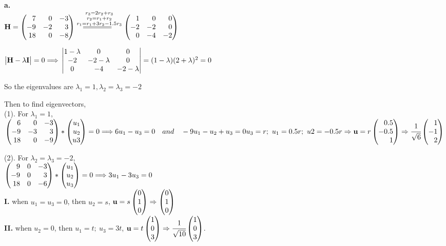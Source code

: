 \documentclass[12pt,a4paper]{article}
\begin{document}
    \textbf{a.}\\
    $\mathbf{H}=\newvec{7&0&-3\\-9&-2&3\\18&0&-8}\stackrel{r_3=2r_2+r_3}{\stackrel{r_2=r_1+r_2}{\stackrel{r_1=r_1+3r_2-1.5r_3}{\longeq{6}}}}\newvec{1&0&0\\-2&-2&0\\0&-4&-2}$

    $\begin{vmatrix} \mathbf{H}-\lambda \mathbf{I} \end{vmatrix}=0 \Longrightarrow \\
    \begin{vmatrix} 1-\lambda&0&0\\-2&-2-\lambda&0\\0&-4&-2-\lambda \end{vmatrix}=(1-\lambda)(2+\lambda)^2=0$

    \noindent So the eigenvalues are $\lambda_1=1,\lambda_2=\lambda_3=-2$

    \noindent Then to find eigenvectors, \\
    (1). For $\lambda_1=1$,\\
    $\newvec{6&0&-3\\-9&-3&3\\18&0&-9}*\newvec{u_1\\u_2\\u3}=0\Longrightarrow 6u_1-u_3=0\quad and \quad -9u_1-u_2+u_3=0\\
    u_3=r;\ u_1=0.5r;\ u2=-0.5r \Rightarrow \mathbf{u}=r\newvec{0.5\\-0.5\\1}\Rightarrow \cfrac{1}{\sqrt{6}}\newvec{1\\-1\\2}$

    \noindent (2). For $\lambda_2=\lambda_3=-2$,\\
    $\newvec{9&0&-3\\-9&0&3\\18&0&-6}*\newvec{u_1\\u_2\\u_3}=0\Longrightarrow 3u_1-3u_3=0$\\
    \textbf{I.} when $u_1=u_3=0$, then $u_2=s$, $\mathbf{u}=s\newvec{0\\1\\0}\Rightarrow\newvec{0\\1\\0}$\\
    \textbf{II.} when $u_2=0$, then $u_1=t;\ u_3=3t$, $\mathbf{u}=t\newvec{1\\0\\3}\Rightarrow\cfrac{1}{\sqrt{10}}\newvec{1\\0\\3}$.
\end{document}
